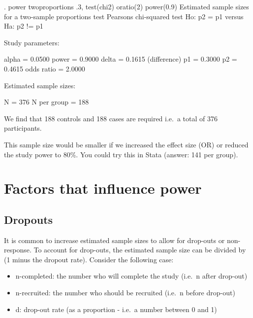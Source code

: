 \documentclass[
]{memoir}
\newenvironment{Shaded}{\begin{snugshade}}{\end{snugshade}}
\newcommand{\NormalTok}[1]{#1}
\providecommand{\tightlist}{%
  \setlength{\itemsep}{0pt}\setlength{\parskip}{0pt}}
\begin{document}
\begin{Shaded}
\begin{Highlighting}[]
\NormalTok{. power twoproportions .3, test(chi2) oratio(2) power(0.9)}
\NormalTok{Estimated sample sizes for a two{-}sample proportions test}
\NormalTok{Pearson\textquotesingle{}s chi{-}squared test }
\NormalTok{Ho: p2 = p1  versus  Ha: p2 != p1}

\NormalTok{Study parameters:}

\NormalTok{        alpha =    0.0500}
\NormalTok{        power =    0.9000}
\NormalTok{        delta =    0.1615  (difference)}
\NormalTok{           p1 =    0.3000}
\NormalTok{           p2 =    0.4615}
\NormalTok{   odds ratio =    2.0000}

\NormalTok{Estimated sample sizes:}

\NormalTok{            N =       376}
\NormalTok{  N per group =       188}
\end{Highlighting}
\end{Shaded}

We find that 188 controls and 188 cases are required i.e.~a total of 376 participants.

This sample size would be smaller if we increased the effect size (OR) or reduced the study power to 80\%. You could try this in Stata (answer: 141 per group).

\hypertarget{factors-that-influence-power}{%
\section{Factors that influence power}\label{factors-that-influence-power}}

\hypertarget{dropouts}{%
\subsection{Dropouts}\label{dropouts}}

It is common to increase estimated sample sizes to allow for drop-outs or non-response. To account for drop-outs, the estimated sample size can be divided by (1 minus the dropout rate). Consider the following case:

\begin{itemize}
\tightlist
\item
  n-completed: the number who will complete the study (i.e.~n after drop-out)
\item
  n-recruited: the number who should be recruited (i.e.~n before drop-out)
\item
  d: drop-out rate (as a proportion - i.e.~a number between 0 and 1)
\end{itemize}
\end{document}
